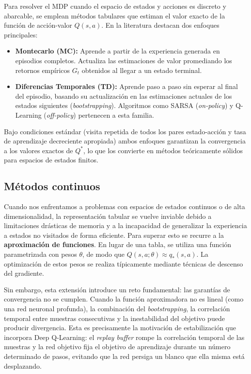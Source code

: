 Para resolver el MDP cuando el espacio de estados y acciones es discreto y abarcable, se emplean métodos tabulares que estiman el valor exacto de la función de acción-valor $Q(s, a)$. En la literatura destacan dos enfoques principales:
\begin{itemize}
    \item \textbf{Montecarlo (MC):} Aprende a partir de la experiencia generada en episodios completos. Actualiza las estimaciones de valor promediando los retornos empíricos $G_t$ obtenidos al llegar a un estado terminal. 
    \item \textbf{Diferencias Temporales (TD):} Aprende paso a paso sin esperar al final del episodio, basando su actualización en las estimaciones actuales de los estados siguientes (\textit{bootstrapping}). Algoritmos como SARSA (\textit{on-policy}) y Q-Learning (\textit{off-policy}) pertenecen a esta familia.
\end{itemize}

Bajo condiciones estándar (visita repetida de todos los pares estado-acción y tasa de aprendizaje decreciente apropiada) ambos enfoques garantizan la convergencia a los valores exactos de $Q^*$, lo que los convierte en métodos teóricamente sólidos para espacios de estados finitos.

\subsection{Métodos continuos}

Cuando nos enfrentamos a problemas con espacios de estados continuos o de alta dimensionalidad, la representación tabular se vuelve inviable debido a limitaciones drásticas de memoria y a la incapacidad de generalizar la experiencia a estados no visitados de forma eficiente. Para superar esto se recurre a la \textbf{aproximación de funciones}. En lugar de una tabla, se utiliza una función parametrizada con pesos $\theta$, de modo que $Q(s, a; \theta) \approx q_*(s, a)$. La optimización de estos pesos se realiza típicamente mediante técnicas de descenso del gradiente.

Sin embargo, esta extensión introduce un reto fundamental: las garantías de convergencia no se cumplen. Cuando la función aproximadora no es lineal (como una red neuronal profunda), la combinación del \textit{bootstrapping}, la correlación temporal entre muestras consecutivas y la inestabilidad del objetivo puede producir divergencia. Esta es precisamente la motivación de estabilización que incorpora Deep Q-Learning: el \textit{replay buffer} rompe la correlación temporal de las muestras y la red objetivo fija el objetivo de aprendizaje durante un número determinado de pasos, evitando que la red persiga un blanco que ella misma está desplazando.

